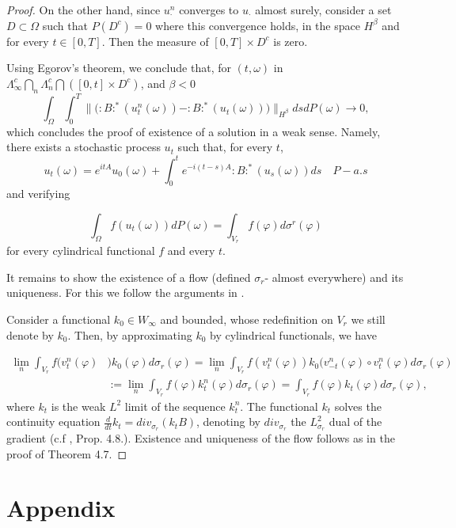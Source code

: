\documentclass[11pt,leqno]{amsart}
\begin{document}
\begin{proof}
On the other hand, since $u_{\cdot}^n$ converges to $u_{\cdot}$ almost surely,  consider a set $D\subset \Omega$ such that $P(D^c )=0$ where this convergence holds, 
in the space $H^{\beta}$ and for every $t\in [0,T]$. Then the measure of $[0,T]\times D^c$ is zero.

Using Egorov's theorem, we conclude that, for $(t,\omega)$ in $\Lambda^c_\infty \bigcap_n \Lambda_n^c \bigcap ([0,t] \times D^c )$, and $\beta <0$ 
$$\int_\Omega \int_0^T  \Big\| \Big( :B:^\ast (u_t^n (\omega))- :B:^\ast (u_t(\omega) )\Big) \Big\|_{H^\beta} ds dP(\omega) \rightarrow 0, $$
which concludes the  proof of existence of a solution in a weak sense. Namely, there exists a stochastic process $u_t$ such that, for every $t$, 
$$u_t (\omega )=e^{itA} u_0 (\omega ) +\int_0^t e^{-i (t-s)A} :B:^\ast (u_s (\omega ))ds \quad P - a.s$$
and verifying

$$\int_{\Omega} f(u_t (\omega )) dP (\omega )= \int_{V_r} f(\varphi)  d\sigma^r(\varphi)$$
for every cylindrical functional $f$ and every $t$.


It remains to show the existence of a flow (defined $\sigma_r$- almost everywhere) and its uniqueness. For this we follow the arguments in \cite{AF}.

Consider a functional $k_0 \in W_{\infty}$ and bounded, whose redefinition on $V_r$ we still denote by $k_0$. Then, by approximating $k_0$ by cylindrical functionals,
we have

\begin{align*}
 \lim_n \int_{V_r}  f(v_t^n (\varphi ) &)k_0 (\varphi )d\sigma_r (\varphi )=\lim_n { \int_{V_r}  }  f(v_t^n (\varphi )) k_0 (v_{-t}^n(\varphi ) \circ v_t^n(\varphi) d\sigma_r (\varphi )\\
&:=\lim_n \int_{V_r} f(\varphi)  k_t^n (\varphi) d\sigma_r(\varphi) = \int_{V_r} f (\varphi)  k_t(\varphi)   d\sigma_r (\varphi),
\end{align*}
where $k_t$ is the weak $L^2$ limit of the sequence $k_t^n$. The functional $k_t $ solves the continuity equation $\frac{d}{dt} k_t =div_{\sigma_r} (k_t B) $, 
denoting by $ div_{\sigma_r} $ the $L^2_{\sigma_r}$ dual of the gradient (c.f \cite{AF}, Prop. 4.8.).
Existence and uniqueness of the flow follows as in the proof of \cite{AF} Theorem 4.7.






\end{proof}



\section{Appendix}
\end{document}
